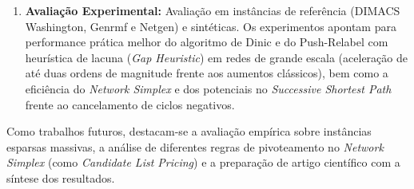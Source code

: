 \begin{enumerate}[leftmargin=1.5em, itemsep=0.2em, topsep=0.2em, parsep=0em]
    \item \textbf{Avaliação Experimental:} Avaliação em instâncias de referência (DIMACS Washington, Genrmf e Netgen) e sintéticas. Os experimentos apontam para performance prática melhor do algoritmo de Dinic e do Push-Relabel com heurística de lacuna (\textit{Gap Heuristic}) em redes de grande escala (aceleração de até duas ordens de magnitude frente aos aumentos clássicos), bem como a eficiência do \textit{Network Simplex} e dos potenciais no \textit{Successive Shortest Path} frente ao cancelamento de ciclos negativos.
\end{enumerate}

Como trabalhos futuros, destacam-se a avaliação empírica sobre instâncias esparsas massivas, a análise de diferentes regras de pivoteamento no \textit{Network Simplex} (como \textit{Candidate List Pricing}) e a preparação de artigo científico com a síntese dos resultados.
